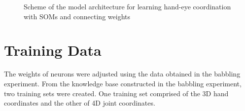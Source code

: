 \begin{figure}[t]
\centering
{}
\caption{Scheme of the model architecture for learning hand-eye coordination with SOMs and connecting weights}
\label{lab:model}
\end{figure}

\section{Training Data}
\label{sec:modeltrain}

The weights of neurons were adjusted using the data obtained in the babbling experiment. 
From the knowledge base constructed in the babbling experiment, two training sets were created. One training set comprised of the 3D hand coordinates and the other of 4D joint coordinates.


